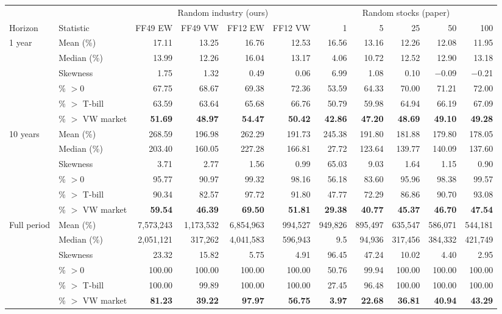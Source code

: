 \begin{tabular}{@{}llrrrrrrrrr@{}}
\toprule
& & \multicolumn{4}{c}{Random industry (ours)} & \multicolumn{5}{c}{Random stocks (paper)} \\
\cmidrule(lr){3-6} \cmidrule(l){7-11}
Horizon & Statistic & FF49 EW & FF49 VW & FF12 EW & FF12 VW & 1 & 5 & 25 & 50 & 100 \\ \midrule
1 year & Mean (\%) & 17.11 & 13.25 & 16.76 & 12.53 & 16.56 & 13.16 & 12.26 & 12.08 & 11.95 \\
 & Median (\%) & 13.99 & 12.26 & 16.04 & 13.17 & 4.06 & 10.72 & 12.52 & 12.90 & 13.18 \\
 & Skewness & 1.75 & 1.32 & 0.49 & 0.06 & 6.99 & 1.08 & 0.10 & $-$0.09 & $-$0.21 \\
 & \% $>0$ & 67.75 & 68.67 & 69.38 & 72.36 & 53.59 & 64.33 & 70.00 & 71.21 & 72.00 \\
 & \% $>$ T-bill & 63.59 & 63.64 & 65.68 & 66.76 & 50.79 & 59.98 & 64.94 & 66.19 & 67.09 \\
 & \% $>$ VW market & \textbf{51.69} & \textbf{48.97} & \textbf{54.47} & \textbf{50.42} & \textbf{42.86} & \textbf{47.20} & \textbf{48.69} & \textbf{49.10} & \textbf{49.28} \\
\midrule
10 years & Mean (\%) & 268.59 & 196.98 & 262.29 & 191.73 & 245.38 & 191.80 & 181.88 & 179.80 & 178.05 \\
 & Median (\%) & 203.40 & 160.05 & 227.28 & 166.81 & 27.72 & 123.64 & 139.77 & 140.09 & 137.60 \\
 & Skewness & 3.71 & 2.77 & 1.56 & 0.99 & 65.03 & 9.03 & 1.64 & 1.15 & 0.90 \\
 & \% $>0$ & 95.77 & 90.97 & 99.32 & 98.16 & 56.18 & 83.60 & 95.96 & 98.38 & 99.57 \\
 & \% $>$ T-bill & 90.34 & 82.57 & 97.72 & 91.80 & 47.77 & 72.29 & 86.86 & 90.70 & 93.08 \\
 & \% $>$ VW market & \textbf{59.54} & \textbf{46.39} & \textbf{69.50} & \textbf{51.81} & \textbf{29.38} & \textbf{40.77} & \textbf{45.37} & \textbf{46.70} & \textbf{47.54} \\
\midrule
Full period & Mean (\%) & 7,573,243 & 1,173,532 & 6,854,963 & 994,527 & 949,826 & 895,497 & 635,547 & 586,071 & 544,181 \\
 & Median (\%) & 2,051,121 & 317,262 & 4,041,583 & 596,943 & 9.5 & 94,936 & 317,456 & 384,332 & 421,749 \\
 & Skewness & 23.32 & 15.82 & 5.75 & 4.91 & 96.45 & 47.24 & 10.02 & 4.40 & 2.95 \\
 & \% $>0$ & 100.00 & 100.00 & 100.00 & 100.00 & 50.76 & 99.94 & 100.00 & 100.00 & 100.00 \\
 & \% $>$ T-bill & 100.00 & 99.89 & 100.00 & 100.00 & 27.45 & 96.48 & 100.00 & 100.00 & 100.00 \\
 & \% $>$ VW market & \textbf{81.23} & \textbf{39.22} & \textbf{97.97} & \textbf{56.75} & \textbf{3.97} & \textbf{22.68} & \textbf{36.81} & \textbf{40.94} & \textbf{43.29} \\
\bottomrule
\end{tabular}
